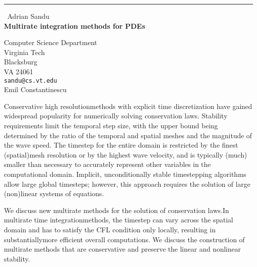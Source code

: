\documentclass{report}
\begin{document}
\begin{center}
\rule{6in}{1pt} \
{\large Adrian Sandu \\
{\bf Multirate integration methods for PDEs}}

Computer Science Department \\ Virginia Tech \\ Blacksburg \\ VA 24061
\\
{\tt sandu@cs.vt.edu}\\
Emil Constantinescu\end{center}



Conservative high resolutionmethods with explicit time discretization
have gained widespread popularity for numerically solving conservation
laws. Stability requirements limit the temporal step size, with the upper
bound being determined by the ratio of the temporal and spatial
meshes and the magnitude of the wave speed. The timestep for the entire
domain is restricted by the finest (spatial)mesh resolution or by the highest
wave velocity, and is typically (much) smaller than necessary to accurately
represent other variables in the computational domain.
Implicit, unconditionally stable timestepping algorithms allow large
global timesteps; however, this approach requires the solution of large
(non)linear systems of equations.

We discuss new multirate methods for the solution of conservation laws.In
multirate time integrationmethods, the timestep can vary across the
spatial domain and has to satisfy the CFL condition only locally, resulting
in substantiallymore efficient overall computations. We discuss the
construction of multirate methods that are conservative and preserve the
linear and nonlinear stability.
\end{document}
